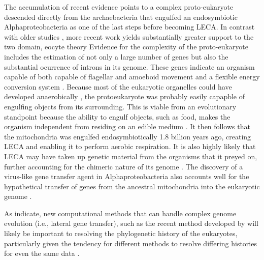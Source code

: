 \documentclass{article}
\begin{document}
    The accumulation of recent evidence points to a complex proto-eukaryote
        descended directly from the archaebacteria that engulfed an
        endosymbiotic Alphaproteobacteria as one of the last steps before
        becoming LECA.
    In contrast with older studies \parencite{Hed+01,Gri+10}, more recent work yields
        substantially greater support to the two domain, eocyte theory
        \parencite{KWG11,Thi+12,Wil+13}
    Evidence for the complexity of the proto-eukaryote includes the estimation
        of not only a large number of genes \parencite{Koo10a} but also the
        substantial ocurrence of introns \parencite{CRK11} in its genome.
    These genes indicate an organism capable of both capable of flagellar and
        amoeboid movement and a flexible energy conversion system
        \parencite{Koo10a}.
    Because most of the eukaryotic organelles could have developed anaerobically
        \parencite{Duv07}, the protoeukaryote was probably easily capapble of
        engulfing objects from its surrounding.
    This is viable from an evolutionary standpoint because the ability to
        engulf objects, such as food, makes the organism independent from
        residing on an edible medium \parencite{Duv07}.
    It then follows that the mitochondria was engulfed endosymbiotically 1.8
        billion years ago, creating LECA and enabling it to perform aerobic
        respiration.
    It is also highly likely that LECA may have taken up genetic material from
        the organisms that it preyed on, further accounting for the chimeric
        nature of its genome \parencite{Kat12}.
    The discovery of a virus-like gene transfer agent in Alphaproteobacteria
        also accounts well for the hypothetical transfer of genes from the
        ancestral mitochondria into the eukaryotic genome \parencite{RA11}.

    As \textcite{Gri+10} indicate, new computational methods that can handle
        complex genome evolution (i.e., lateral gene transfer), such as the
        recent method developed by \textcite{Sjo+14} will likely be important
        to resolving the phylogenetic history of the eukaryotes, particularly
        given the tendency for different methods to resolve differing histories
        for even the same data \parencite{Wil+13}.

    \printbibliography
\end{document}
